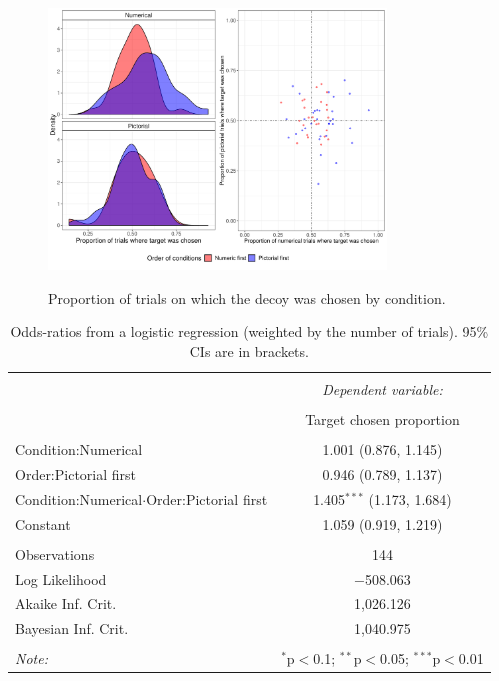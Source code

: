 \documentclass[11pt,a4paper]{article}
\begin{document}
\begin{figure}[htp]
\centering
\caption{Proportion of trials on which the decoy was chosen by condition.}
\includegraphics[width=0.8\textwidth]{./Teapot_condorder.pdf}
\label{fig:Teapot_condorder}
\end{figure}


\begin{table}[!htbp] \centering 
\captionsetup{justification=centering}
  \caption{Odds-ratios from a logistic regression (weighted by the number of trials). 95\% CIs are in brackets.} 
  \label{mixedeff} 
\begin{tabular}{@{\extracolsep{5pt}}lc} 
\\[-1.8ex]\hline 
\hline \\[-1.8ex] 
 & \multicolumn{1}{c}{\textit{Dependent variable:}} \\ 
\cline{2-2} 
\\[-1.8ex] & Target chosen proportion \\ 
\hline \\[-1.8ex] 
 Condition:Numerical & 1.001 (0.876, 1.145) \\ 
  Order:Pictorial first & 0.946 (0.789, 1.137) \\ 
  Condition:Numerical$\cdot$Order:Pictorial first & 1.405$^{***}$ (1.173, 1.684) \\ 
  Constant & 1.059 (0.919, 1.219) \\ 
 \hline \\[-1.8ex] 
Observations & 144 \\ 
Log Likelihood & $-$508.063 \\ 
Akaike Inf. Crit. & 1,026.126 \\ 
Bayesian Inf. Crit. & 1,040.975 \\ 
\hline 
\hline \\[-1.8ex] 
\textit{Note:}  & \multicolumn{1}{r}{$^{*}$p$<$0.1; $^{**}$p$<$0.05; $^{***}$p$<$0.01} \\ 
\end{tabular} 
\end{table} 
\end{document}
